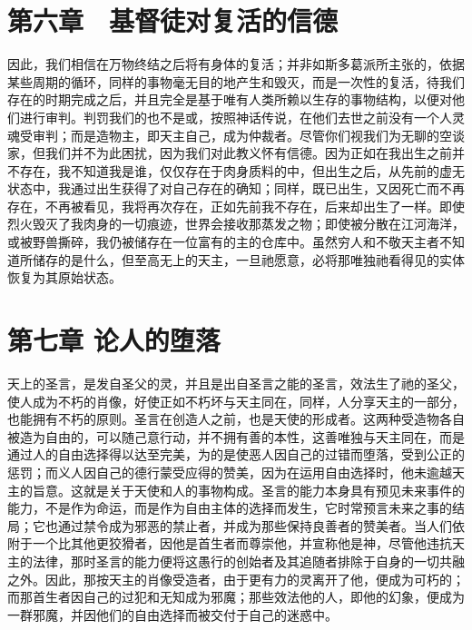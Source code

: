 
\section{第六章　基督徒对复活的信德}

因此，我们相信在万物终结之后将有身体的复活；并非如斯多葛派所主张的，依据某些周期的循环，同样的事物毫无目的地产生和毁灭，而是一次性的复活，待我们存在的时期完成之后，并且完全是基于唯有人类所赖以生存的事物结构，以便对他们进行审判。判罚我们的也不是或，按照神话传说，在他们去世之前没有一个人灵魂受审判；而是造物主，即天主自己，成为仲裁者。尽管你们视我们为无聊的空谈家，但我们并不为此困扰，因为我们对此教义怀有信德。因为正如在我出生之前并不存在，我不知道我是谁，仅仅存在于肉身质料的中，但出生之后，从先前的虚无状态中，我通过出生获得了对自己存在的确知；同样，既已出生，又因死亡而不再存在，不再被看见，我将再次存在，正如先前我不存在，后来却出生了一样。即使烈火毁灭了我肉身的一切痕迹，世界会接收那蒸发之物；即使被分散在江河海洋，或被野兽撕碎，我仍被储存在一位富有的主的仓库中。虽然穷人和不敬天主者不知道所储存的是什么，但至高无上的天主，一旦祂愿意，必将那唯独祂看得见的实体恢复为其原始状态。\par


\section{第七章 论人的堕落}

天上的圣言，是发自圣父的灵，并且是出自圣言之能的圣言，效法生了祂的圣父，使人成为不朽的肖像，好使正如不朽坏与天主同在，同样，人分享天主的一部分，也能拥有不朽的原则。圣言在创造人之前，也是天使的形成者。这两种受造物各自被造为自由的，可以随己意行动，并不拥有善的本性，这善唯独与天主同在，而是通过人的自由选择得以达至完美，为的是使恶人因自己的过错而堕落，受到公正的惩罚；而义人因自己的德行蒙受应得的赞美，因为在运用自由选择时，他未逾越天主的旨意。这就是关于天使和人的事物构成。圣言的能力本身具有预见未来事件的能力，不是作为命运，而是作为自由主体的选择而发生，它时常预言未来之事的结局；它也通过禁令成为邪恶的禁止者，并成为那些保持良善者的赞美者。当人们依附于一个比其他更狡猾者，因他是首生者而尊崇他，并宣称他是神，尽管他违抗天主的法律，那时圣言的能力便将这愚行的创始者及其追随者排除于自身的一切共融之外。因此，那按天主的肖像受造者，由于更有力的灵离开了他，便成为可朽的；而那首生者因自己的过犯和无知成为邪魔；那些效法他的人，即他的幻象，便成为一群邪魔，并因他们的自由选择而被交付于自己的迷惑中。\par

